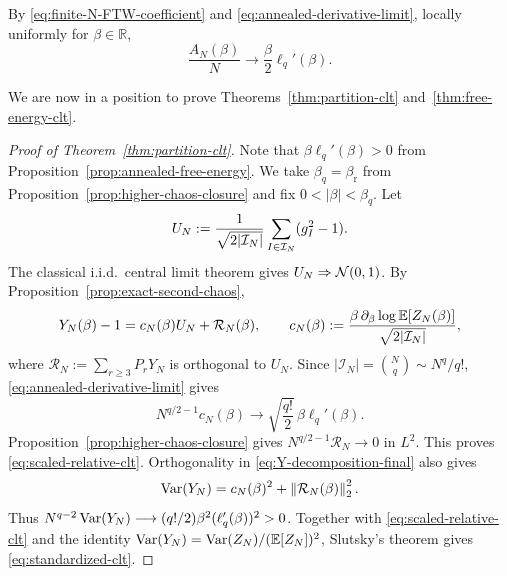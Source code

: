 \documentclass[../CLT_SYK.tex]{subfiles}
\begin{document}
By \eqref{eq:finite-N-FTW-coefficient} and
\eqref{eq:annealed-derivative-limit}, locally uniformly for
$\beta\in\mathbb R$,
\begin{equation*}
  \frac{A_N(\beta)}N\longrightarrow
  \frac\beta2\ell_q'(\beta).
\end{equation*}

We are now in a position to prove Theorems~\ref{thm:partition-clt} and~\ref{thm:free-energy-clt}.

\begin{proof}[Proof of Theorem~\ref{thm:partition-clt}]
Note that $\beta\ell_q'(\beta)>0$ from Proposition~\ref{prop:annealed-free-energy}. We take $\beta_q=\beta_{\mathrm r}$ from Proposition~\ref{prop:higher-chaos-closure} and fix $0<|\beta|<\beta_q$. Let
\[
  U_N:=\frac1{\sqrt{2|\mathcal I_N|}}\sum_{I\in\mathcal I_N}(g_I^2-1).
\]
The classical i.i.d.\ central limit theorem gives
$U_N\Rightarrow\mathcal N(0,1)$.
By {Proposition~\ref{prop:exact-second-chaos}},
\begin{equation}\label{eq:Y-decomposition-final}
  Y_N(\beta)-1
  =c_N(\beta)U_N+\mathcal R_N(\beta),
  \qquad
  c_N(\beta)
  :=\frac{\beta\,\partial_\beta\log \mathbb E[Z_N(\beta)]}{\sqrt{2|\mathcal I_N|}},
\end{equation}
where $\mathcal R_N:=\sum_{r\geq3}P_r Y_N$ is orthogonal to $U_N$.
Since $|\mathcal I_N|=\binom Nq\sim N^q/q!$, \eqref{eq:annealed-derivative-limit} gives
\[
  N^{q/2-1}c_N(\beta)
  \longrightarrow
  \sqrt{\frac{q!}{2}}\,\beta\ell_q'(\beta).
\]
Proposition~\ref{prop:higher-chaos-closure} gives
$N^{q/2-1}\mathcal R_N\to0$ in $L^2$.  This proves
\eqref{eq:scaled-relative-clt}.  Orthogonality in
\eqref{eq:Y-decomposition-final} also gives
\[
  \operatorname{Var}(Y_N)=c_N(\beta)^2+\left\lVert \mathcal R_N(\beta)\right\rVert_2^2.
\]
Thus $N^{q-2}\operatorname{Var}(Y_N)\longrightarrow(q!/2)\beta^2(\ell_q'(\beta))^2>0$.
Together with \eqref{eq:scaled-relative-clt} and the identity
$\operatorname{Var}(Y_N)=\operatorname{Var}(Z_N)/(\mathbb E[Z_N])^2$, Slutsky's theorem gives
\eqref{eq:standardized-clt}.
\end{proof}
\end{document}
